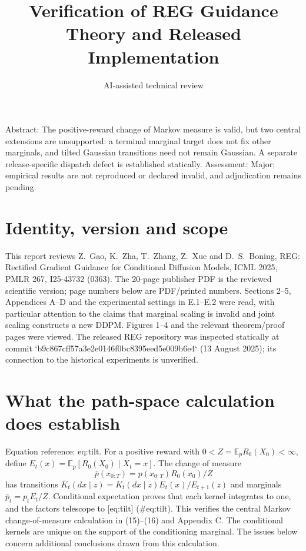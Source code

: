 \documentclass[10pt]{article}
\title{Verification of REG Guidance Theory and Released Implementation}
\author{AI-assisted technical review}
\date{}
\begin{document}
\maketitle
Abstract: The positive-reward change of Markov measure is valid, but two central extensions are unsupported: a terminal marginal target does not fix other marginals, and tilted Gaussian transitions need not remain Gaussian. A separate release-specific dispatch defect is established statically. Assessment: Major; empirical results are not reproduced or declared invalid, and adjudication remains pending.\par
\section*{Identity, version and scope}
This report reviews Z. Gao, K. Zha, T. Zhang, Z. Xue and D. S. Boning, REG: Rectified Gradient Guidance for Conditional Diffusion Models, ICML 2025, PMLR 267, I25-43732 (0363). The 20-page publisher PDF is the reviewed scientific version; page numbers below are PDF/printed numbers. Sections 2–5, Appendices A–D and the experimental settings in E.1–E.2 were read, with particular attention to the claims that marginal scaling is invalid and joint scaling constructs a new DDPM. Figures 1–4 and the relevant theorem/proof pages were viewed. The released REG repository was inspected statically at commit `b9c867cff57a3e2e0146f0bc8395eed5e009b6e4` (13 August 2025); its connection to the historical experiments is unverified.\par
\section*{What the path-space calculation does establish}
Equation reference: eq:tilt. For a positive reward with \(0<Z=\mathbb E_pR_0(X_0)<\infty\), define \(E_t(x)=\mathbb E_p[R_0(X_0)\mid X_t=x]\). The change of measure \[
 \bar p(x_{0:T})=p(x_{0:T})R_0(x_0)/Z\] has transitions \(\bar K_t(dx\mid z)=K_t(dx\mid z)E_t(x)/E_{t+1}(z)\) and marginals \(\bar p_t=p_tE_t/Z\). Conditional expectation proves that each kernel integrates to one, and the factors telescope to [eq:tilt] (\#eq:tilt). This verifies the central Markov change-of-measure calculation in (15)–(16) and Appendix C. The conditional kernels are unique on the support of the conditioning marginal. The issues below concern additional conclusions drawn from this calculation.\par
\end{document}
